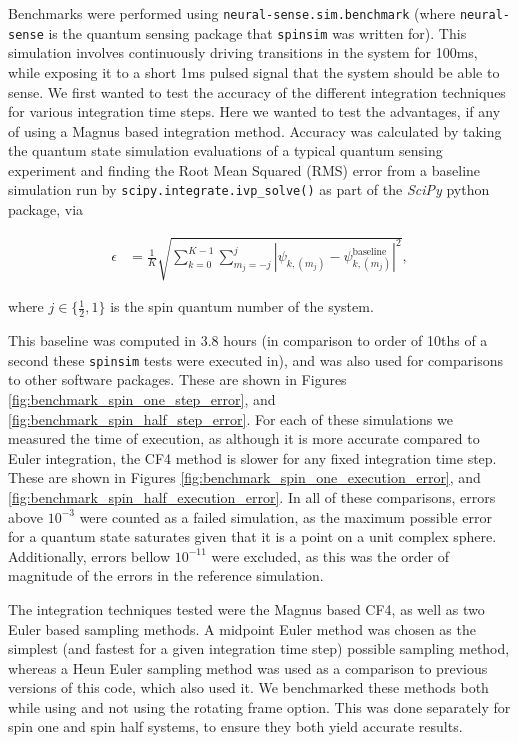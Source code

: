 \documentclass{jors}
\begin{document}
	Benchmarks were performed using \texttt{neural-sense.sim.benchmark} (where \texttt{neural-sense} \cite{alexander-tritt-monash_alexander-tritt-monashneural-sense_2020} is the quantum sensing package that \texttt{spinsim} was written for). This simulation involves continuously driving transitions in the system for 100ms, while exposing it to a short 1ms pulsed signal that the system should be able to sense. We first wanted to test the accuracy of the different integration techniques for various integration time steps. Here we wanted to test the advantages, if any of using a Magnus based integration method. Accuracy was calculated by taking the quantum state simulation evaluations of a typical quantum sensing experiment and finding the Root Mean Squared (RMS) error from a baseline simulation run by \texttt{scipy.integrate.ivp\_solve()} as part of the \emph{SciPy} python package, via

		\begin{align}
			\epsilon &= \frac{1}{K}\sqrt{\sum_{k = 0}^{K - 1}\sum_{m_j = -j}^j|\psi_{k, (m_j)} - \psi_{k, (m_j)}^{\textrm{baseline}}|^2},\label{eq:error}
		\end{align}

		where \(j \in \{\frac12, 1\}\) is the spin quantum number of the system.

		This baseline was computed in 3.8 hours (in comparison to order of 10ths of a second these \texttt{spinsim} tests were executed in), and was also used for comparisons to other software packages. These are shown in Figures \ref{fig:benchmark_spin_one_step_error}, and \ref{fig:benchmark_spin_half_step_error}. For each of these simulations we measured the time of execution, as although it is more accurate compared to Euler integration, the CF4 method is slower for any fixed integration time step. These are shown in Figures \ref{fig:benchmark_spin_one_execution_error}, and \ref{fig:benchmark_spin_half_execution_error}. In all of these comparisons, errors above \(10^{-3}\) were counted as a failed simulation, as the maximum possible error for a quantum state saturates given that it is a point on a unit complex sphere. Additionally, errors bellow \(10^{-11}\) were excluded, as this was the order of magnitude of the errors in the reference simulation.

		The integration techniques tested were the Magnus based CF4, as well as two Euler based sampling methods. A midpoint Euler method was chosen as the simplest (and fastest for a given integration time step)  possible sampling method, whereas a Heun Euler sampling method was used as a comparison to previous versions of this code, which also used it. We benchmarked these methods both while using and not using the rotating frame option. This was done separately for spin one and spin half systems, to ensure they both yield accurate results.
\end{document}
